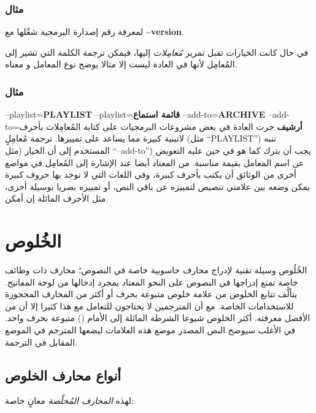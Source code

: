\subsubsection{مثال}
لمعرفة رقم إصدارة البرمجية شغّلها مع {\bf --version}.

في حال كانت الخيارات تقبل تمرير {\it مُعامِلات} إليها، فيمكن ترجمة
الكلمة التي تشير إلى المُعامِل لأنها في العادة ليست إلا مثالا يوضح نوع
المعامل و معناه.

\subsubsection{مثال}
\starttable[|l|l|]
\HL
\NC {} \NC {}\NC\AR
\HL
\NC --playlist={\bf PLAYLIST} \NC --playlist={\bf قائمة استماع}\NC\AR
\HL
\NC --add-to={\bf ARCHIVE} \NC --add-to={\bf أرشيف}\NC\AR
\HL
\stoptable
جرت العادة في بعض مشروعات البرمجيات على كتابة المُعامِلات بأحرف لاتينية
كبيرة مما يساعد على تمييزها. ترجمة مُعامِلٍ (مثل “PLAYLIST”) تنبه
المستخدم إلى أن الخيار (مثل ‪“--add-to”‬) يجب أن يترك كما هو في حين
عليه التعويض عن اسم المعامل بقيمة مناسبة. من المعتاد أيضا عند الإشارة
إلى المُعامِل في مواضع أخرى من الوثائق أن يكتب بأحرف كبيرة، وفي اللغات
التي لا توجد بها حروف كبيرة يمكن وضعه بين علامتي تنصيص لتمييزه عن باقي
النص، أو تمييزه بصريا بوسيلة أخرى، مثل الأحرف المائلة إن أمكن.

\section{الخُلوص}
الخُلُوص وسيلة تقنية لإدراج محارف حاسوبية خاصة في النصوص؛ محارف ذات
وظائف خاصة تمنع إدراجها في النصوص على النحو المعتاد بمجرد إدخالها من
لوحة المفاتيح. يتألَّف تتابع الخلوص من علامة خلوص متبوعة بحرف أو أكثر
من المحارف المحجوزة للاستخدامات الخاصة. مع أن المترجمين لا يحتاجون
للتعامل مع هذا كثيرا إلا أن من الأفضل معرفته. أكثر الخلوص شيوعا الشرطة
المائلة إلى الأمام ( ) متبوعة بحرف واحد. في الأغلب
سيوضح النص المصدر موضع هذه العلامات ليضعها المترجم في الموضع المقابل في
الترجمة.

\subsection{أنواع محارف الخلوص}
لهذه {\it المحارف المُخلّصة} معانٍ خاصة:

